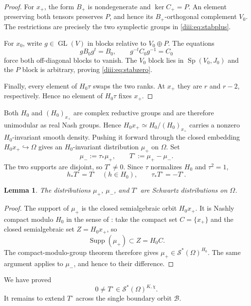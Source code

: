 \documentclass[10pt,a4paper]{amsart}
\numberwithin{equation}{section}
\newtheorem{lemma}[theorem]{Lemma}
\newcommand{\GL}{\operatorname{GL}}
\newcommand{\Sp}{\operatorname{Sp}}
\newcommand{\Supp}{\operatorname{Supp}}
\newcommand{\cS}{\mathcal S}
\begin{document}
\begin{proof}
For $x_+$, the form $B_+$ is nondegenerate and $\ker C_+=P$.  An element preserving both tensors preserves $P$, and hence its $B_+$-orthogonal complement $V_0$.  The restrictions are precisely the two symplectic groups in \eqref{diii:eq:stabplus}.

For $x_0$, write $g\in\GL(V)$ in blocks relative to $V_0\oplus P$.
The equations
\[
  gB_0g^t=B_0,
  \qquad
  g^{-t}C_0g^{-1}=C_0
\]
force both off-diagonal blocks to vanish.  The $V_0$ block lies in
$\Sp(V_0,J_0)$ and the $P$ block is arbitrary, proving \eqref{diii:eq:stabzero}.

Finally, every element of $H_0\tau$ swaps the two ranks.  At $x_+$ they are
$r$ and $r-2$, respectively.  Hence no element of $H_0\tau$ fixes $x_+$.
\end{proof}

Both $H_0$ and $(H_0)_{x_+}$ are complex reductive groups and are therefore unimodular as real Nash groups.  Hence
$H_0x_+\simeq H_0/(H_0)_{x_+}$ carries a nonzero $H_0$-invariant smooth density.  Pushing it forward through the closed embedding
$H_0x_+\hookrightarrow\Omega$ gives an $H_0$-invariant distribution $\mu_+$ on $\Omega$.  Set
\[
  \mu_-:=\tau_*\mu_+,
  \qquad
  T^\circ:=\mu_+-\mu_-.
\]
The two supports are disjoint, so $T^\circ\ne0$.  Since $\tau$ normalizes $H_0$ and $\tau^2=1$,
\begin{equation}\label{diii:eq:Topen-equiv}
  h_*T^\circ=T^\circ\quad(h\in H_0),
  \qquad
  \tau_*T^\circ=-T^\circ.
\end{equation}

\begin{lemma}\label{diii:lem:orbital-schwartz}
The distributions $\mu_+$, $\mu_-$, and $T^\circ$ are Schwartz distributions on $\Omega$.
\end{lemma}

\begin{proof}
The support of $\mu_+$ is the closed semialgebraic orbit $H_0x_+$.  It is Nashly compact modulo $H_0$ in the sense of \cite[Definition~4.0.3]{AG09}: take the compact set $C=\{x_+\}$ and the closed semialgebraic set
$Z=H_0x_+$, so
\[
  \Supp(\mu_+)\subset Z=H_0C.
\]
The compact-modulo-group theorem \cite[Theorem~B.4.1]{AG09} therefore gives
$\mu_+\in\cS^*(\Omega)^{H_0}$.  The same argument applies to $\mu_-$, and hence to their difference.
\end{proof}

We have proved
\begin{equation}\label{diii:eq:Topen}
  0\ne T^\circ\in\cS^*(\Omega)^{K,\chi}.
\end{equation}
It remains to extend $T^\circ$ across the single boundary orbit $\mathcal B$.
\end{document}
